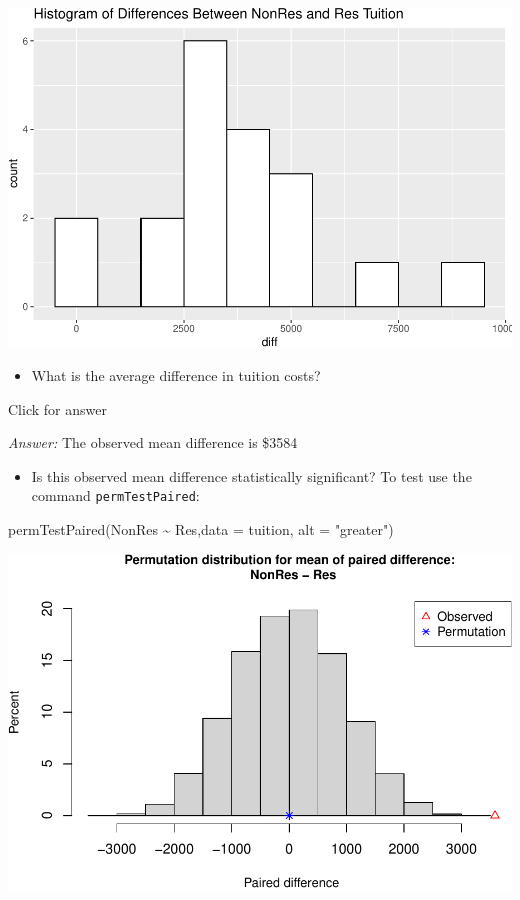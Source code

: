 \documentclass[
]{book}
\newenvironment{Shaded}{\begin{snugshade}}{\end{snugshade}}
\newcommand{\AttributeTok}[1]{\textcolor[rgb]{0.77,0.63,0.00}{#1}}
\newcommand{\FunctionTok}[1]{\textcolor[rgb]{0.00,0.00,0.00}{#1}}
\newcommand{\NormalTok}[1]{#1}
\newcommand{\SpecialCharTok}[1]{\textcolor[rgb]{0.00,0.00,0.00}{#1}}
\newcommand{\StringTok}[1]{\textcolor[rgb]{0.31,0.60,0.02}{#1}}
\providecommand{\tightlist}{%
  \setlength{\itemsep}{0pt}\setlength{\parskip}{0pt}}
\begin{document}
\includegraphics[width=1\linewidth]{Class_Activity_12_files/figure-latex/unnamed-chunk-6-1}

\begin{itemize}
\tightlist
\item
  What is the average difference in tuition costs?
\end{itemize}

Click for answer

\emph{Answer:} The observed mean difference is \$3584

\begin{itemize}
\tightlist
\item
  Is this observed mean difference statistically significant? To test use the command \texttt{permTestPaired}:
\end{itemize}

\begin{Shaded}
\begin{Highlighting}[]
\FunctionTok{permTestPaired}\NormalTok{(NonRes }\SpecialCharTok{\textasciitilde{}}\NormalTok{ Res,}\AttributeTok{data =}\NormalTok{ tuition, }\AttributeTok{alt =} \StringTok{"greater"}\NormalTok{)}
\end{Highlighting}
\end{Shaded}

\includegraphics[width=1\linewidth]{Class_Activity_12_files/figure-latex/unnamed-chunk-7-1}
\end{document}
